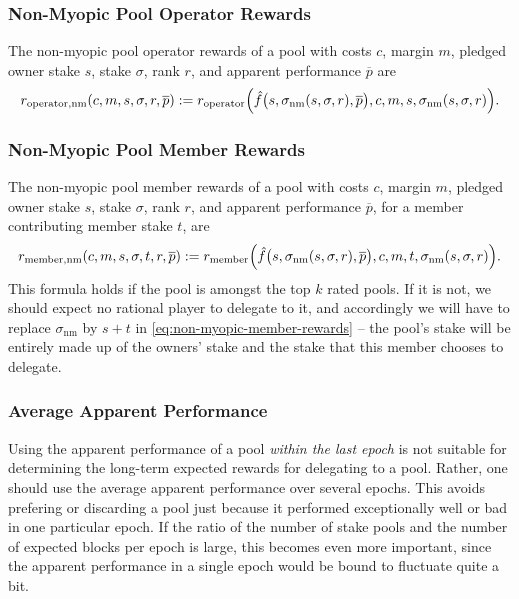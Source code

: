 \documentclass[11pt,a4paper,dvipsnames,twosided]{article}
\newcommand\pbar{\overline{p}}
\begin{document}
\subsubsection{Non-Myopic Pool Operator Rewards}
\label{non-myopic-pool-operator-rewards}

The non-myopic pool operator rewards of a pool with costs \(c\), margin \(m\),
pledged owner stake \(s\), stake \(\sigma\), rank \(r\), and apparent
performance \(\pbar\) are
\[
    r_\mathrm{operator, nm}(c, m, s, \sigma, r, \pbar) :=
    r_\mathrm{operator}\Bigl(
    \hat{f}\bigl(s,\sigma_\mathrm{nm}(s,\sigma, r), \pbar\bigr),
    c, m, s, \sigma_\mathrm{nm}(s,\sigma,r)\Bigr).
\]

\subsubsection{Non-Myopic Pool Member Rewards}
\label{non-myopic-pool-member-rewards}

The non-myopic pool member rewards of a pool with costs \(c\), margin \(m\),
pledged owner stake \(s\), stake \(\sigma\), rank \(r\), and apparent
performance \(\pbar\), for a member contributing member stake \(t\), are
\begin{equation}
    r_\mathrm{member, nm}(c, m, s, \sigma, t, r, \pbar) :=
    r_\mathrm{member}\Bigl(\hat{f}\bigl(s,\sigma_\mathrm{nm}(s,\sigma, r),
    \pbar\bigr),
    c, m, t, \sigma_\mathrm{nm}(s,\sigma,r)\Bigr).
\label{eq:non-myopic-member-rewards}
\end{equation}
This formula holds if the pool is amongst the top \(k\) rated pools. If it is
not, we should expect no rational player to delegate to it, and accordingly we
will have to replace \(\sigma_\mathrm{nm}\) by \(s + t\) in
\cref{eq:non-myopic-member-rewards} -- the pool's stake will be entirely made up
of the owners' stake and the stake that this member chooses to delegate.

\subsubsection{Average Apparent Performance}
\label{average-apparent-performance}

Using the apparent performance of a pool \emph{within the last epoch} is not
suitable for determining the long-term expected rewards for delegating to a
pool. Rather, one should use the average apparent performance over several
epochs. This avoids prefering or discarding a pool just because it performed
exceptionally well or bad in one particular epoch. If the ratio of the number of
stake pools and the number of expected blocks per epoch is large, this becomes
even more important, since the apparent performance in a single epoch would be
bound to fluctuate quite a bit.
\end{document}
